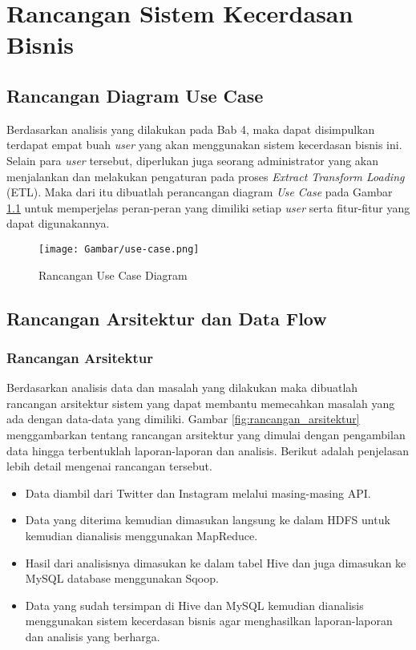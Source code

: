 \chapter{Rancangan Sistem Kecerdasan Bisnis}
\section{Rancangan Diagram Use Case}
Berdasarkan analisis yang dilakukan pada Bab 4, maka dapat disimpulkan terdapat empat buah \textit{user} yang akan menggunakan sistem kecerdasan bisnis ini. Selain para \textit{user} tersebut, diperlukan juga seorang administrator yang akan menjalankan dan melakukan pengaturan pada proses \textit{Extract Transform Loading} (ETL). Maka dari itu dibuatlah perancangan diagram \textit{Use Case} pada Gambar \ref{fig:rancangan_use_case_diagram} untuk memperjelas peran-peran yang dimiliki setiap \textit{user} serta fitur-fitur yang dapat digunakannya.

\begin{figure}[H]
	\centering
	\texttt{[image: Gambar/use-case.png]}
	\caption[Rancangan Use Case Diagram]{Rancangan Use Case Diagram} 
	\label{fig:rancangan_use_case_diagram}
\end{figure}

\section{Rancangan Arsitektur dan Data Flow}
\subsection{Rancangan Arsitektur}
Berdasarkan analisis data dan masalah yang dilakukan maka dibuatlah rancangan arsitektur sistem yang dapat membantu memecahkan masalah yang ada dengan data-data yang dimiliki. Gambar \ref{fig:rancangan_arsitektur} menggambarkan tentang rancangan arsitektur yang dimulai dengan pengambilan data hingga terbentuklah laporan-laporan dan analisis. Berikut adalah penjelasan lebih detail mengenai rancangan tersebut.

\begin{itemize}
	\item Data diambil dari Twitter dan Instagram melalui masing-masing API. 
	\item Data yang diterima kemudian dimasukan langsung ke dalam HDFS untuk kemudian dianalisis menggunakan MapReduce.
	\item Hasil dari analisisnya dimasukan ke dalam tabel Hive dan juga dimasukan ke MySQL database menggunakan Sqoop.
	\item Data yang sudah tersimpan di Hive dan MySQL kemudian dianalisis menggunakan sistem kecerdasan bisnis agar menghasilkan laporan-laporan dan analisis yang berharga.
\end{itemize}


